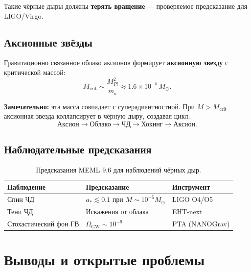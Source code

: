 \documentclass[12pt,a4paper]{article}
\begin{document}
Такие чёрные дыры должны \textbf{терять вращение} --- проверяемое предсказание для LIGO/Virgo.

\subsection{Аксионные звёзды}

Гравитационно связанное облако аксионов формирует \textbf{аксионную звезду} с критической массой:
\begin{equation}
M_{\text{crit}} \sim \frac{M_{Pl}^2}{m_a}
\approx 1.6 \times 10^{-5}\,M_\odot.
\end{equation}

\textbf{Замечательно:} эта масса совпадает с суперадиантностной. При $M > M_{\text{crit}}$ аксионная звезда коллапсирует в чёрную дыру, создавая цикл:
\begin{equation}
\text{Аксион} \to \text{Облако} \to \text{ЧД}
\to \text{Хокинг} \to \text{Аксион}.
\end{equation}

\subsection{Наблюдательные предсказания}

\begin{table}[h!]
\centering
\small
\caption{Предсказания MEML 9.6 для наблюдений чёрных дыр.}
\label{tab:bh-predictions}
\begin{tabular}{@{}p{3.5cm}p{4cm}p{4cm}@{}}
\toprule
\textbf{Наблюдение} & \textbf{Предсказание} & \textbf{Инструмент} \\
\midrule
Спин ЧД & $a_* \lesssim 0.1$ при $M \sim 10^{-5} M_\odot$ & LIGO O4/O5 \\
Тени ЧД & Искажения от облака & EHT-next \\
Стохастический фон ГВ & $\Omega_{\text{GW}} \sim 10^{-9}$ & PTA (NANOGrav) \\
\bottomrule
\end{tabular}
\end{table}

\section{Выводы и открытые проблемы}
\end{document}
